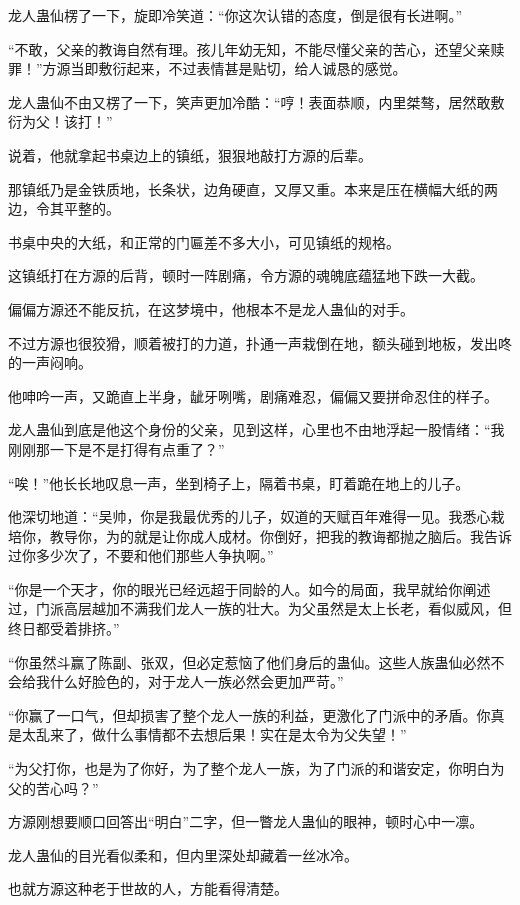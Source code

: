 \begin{this_body}
龙人蛊仙楞了一下，旋即冷笑道：“你这次认错的态度，倒是很有长进啊。”

“不敢，父亲的教诲自然有理。孩儿年幼无知，不能尽懂父亲的苦心，还望父亲赎罪！”方源当即敷衍起来，不过表情甚是贴切，给人诚恳的感觉。

龙人蛊仙不由又楞了一下，笑声更加冷酷：“哼！表面恭顺，内里桀骜，居然敢敷衍为父！该打！”

说着，他就拿起书桌边上的镇纸，狠狠地敲打方源的后辈。

那镇纸乃是金铁质地，长条状，边角硬直，又厚又重。本来是压在横幅大纸的两边，令其平整的。

书桌中央的大纸，和正常的门匾差不多大小，可见镇纸的规格。

这镇纸打在方源的后背，顿时一阵剧痛，令方源的魂魄底蕴猛地下跌一大截。

偏偏方源还不能反抗，在这梦境中，他根本不是龙人蛊仙的对手。

不过方源也很狡猾，顺着被打的力道，扑通一声栽倒在地，额头碰到地板，发出咚的一声闷响。

他呻吟一声，又跪直上半身，龇牙咧嘴，剧痛难忍，偏偏又要拼命忍住的样子。

龙人蛊仙到底是他这个身份的父亲，见到这样，心里也不由地浮起一股情绪：“我刚刚那一下是不是打得有点重了？”

“唉！”他长长地叹息一声，坐到椅子上，隔着书桌，盯着跪在地上的儿子。

他深切地道：“吴帅，你是我最优秀的儿子，奴道的天赋百年难得一见。我悉心栽培你，教导你，为的就是让你成人成材。你倒好，把我的教诲都抛之脑后。我告诉过你多少次了，不要和他们那些人争执啊。”

“你是一个天才，你的眼光已经远超于同龄的人。如今的局面，我早就给你阐述过，门派高层越加不满我们龙人一族的壮大。为父虽然是太上长老，看似威风，但终日都受着排挤。”

“你虽然斗赢了陈副、张双，但必定惹恼了他们身后的蛊仙。这些人族蛊仙必然不会给我什么好脸色的，对于龙人一族必然会更加严苛。”

“你赢了一口气，但却损害了整个龙人一族的利益，更激化了门派中的矛盾。你真是太乱来了，做什么事情都不去想后果！实在是太令为父失望！”

“为父打你，也是为了你好，为了整个龙人一族，为了门派的和谐安定，你明白为父的苦心吗？”

方源刚想要顺口回答出“明白”二字，但一瞥龙人蛊仙的眼神，顿时心中一凛。

龙人蛊仙的目光看似柔和，但内里深处却藏着一丝冰冷。

也就方源这种老于世故的人，方能看得清楚。


\end{this_body}
